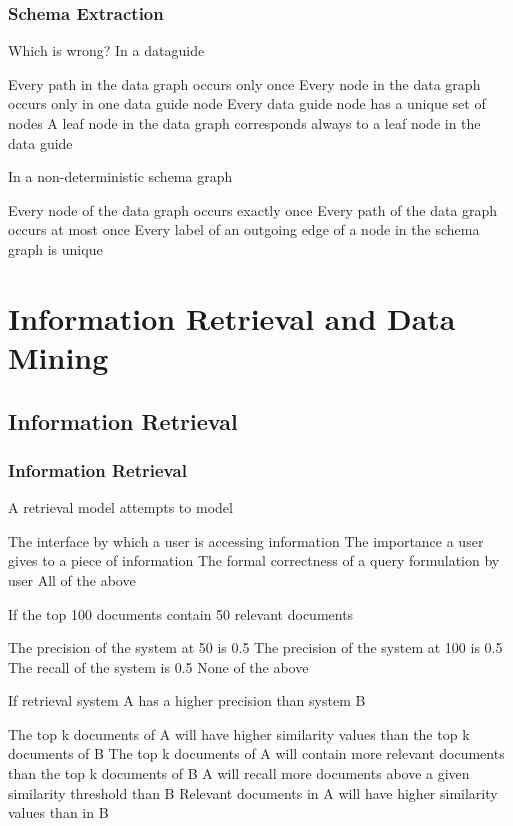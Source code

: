 \documentclass[12pt,a4paper]{exam} %
\begin{document}
\subsubsection{Schema Extraction}
\begin{questions}

\question Which is wrong? In a dataguide
\begin{checkboxes}
\choice Every path in the data graph occurs only once
\CorrectChoice Every node in the data graph occurs only in one data
guide node
\choice Every data guide node has a unique set of nodes
\choice A leaf node in the data graph corresponds always to a
leaf node in the data guide
\end{checkboxes}

\question In a non-deterministic schema graph
\begin{checkboxes}
\CorrectChoice Every node of the data graph occurs exactly once
\choice Every path of the data graph occurs at most once
\choice Every label of an outgoing edge of a node in the
schema graph is unique
\end{checkboxes}
\end{questions}

\section{Information Retrieval and Data Mining}
\subsection{Information Retrieval} %
\subsubsection{Information Retrieval}
\begin{questions}
\question A retrieval model attempts to model
\begin{checkboxes}
\choice The interface by which a user is accessing information
\CorrectChoice The importance a user gives to a piece of information
\choice The formal correctness of a query formulation by user
\choice All of the above
\end{checkboxes}

\question If the top 100 documents contain 50 relevant documents
\begin{checkboxes}
\choice The precision of the system at 50 is 0.5
\choice The precision of the system at 100 is 0.5
\choice The recall of the system is 0.5
\choice None of the above
\end{checkboxes}

\question If retrieval system A has a higher precision than
system B
\begin{checkboxes}
\choice The top k documents of A will have higher similarity
values than the top k documents of B
\choice The top k documents of A will contain more relevant
documents than the top k documents of B
\choice A will recall more documents above a given similarity
threshold than B
\choice Relevant documents in A will have higher similarity
values than in B
\end{checkboxes}
\end{questions}
\end{document}
